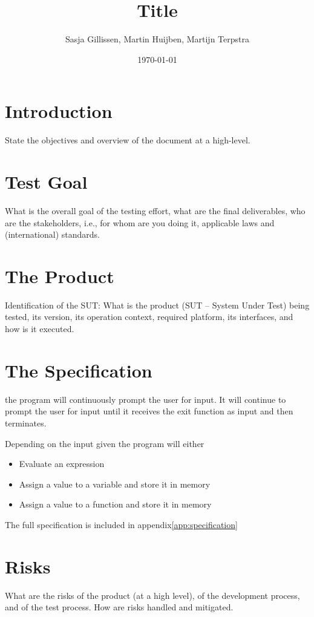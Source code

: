 \documentclass[11pt,a4paper]{article}
\author{Sasja Gillissen, Martin Huijben, Martijn Terpstra}
\date{\today}
\title{Title}
\begin{document}
\maketitle

\section{Introduction}
State the objectives and overview of the document at a high-level.
\section{Test Goal}
What is the overall goal of the testing effort, what are the final deliverables, who are the
stakeholders, i.e., for whom are you doing it, applicable laws and (international) standards.
\section{The Product}
Identification of the SUT: What is the product (SUT – System Under Test) being tested, its
version, its operation context, required platform, its interfaces, and how is it executed.
\section{The Specification}
the program will continuously prompt the user for input. It will
continue to prompt the user for input until it receives the exit
function as input and then terminates.

Depending on the input given the program will either

\begin{itemize}
\item Evaluate an expression
\item Assign a value to a variable and store it in memory
\item Assign a value to a function and store it in memory
\end{itemize}
The full specification is included in appendix\ref{app:specification}

\section{Risks}
What are the risks of the product (at a high level), of the development process, and of the
test process. How are risks handled and mitigated.
\end{document}
